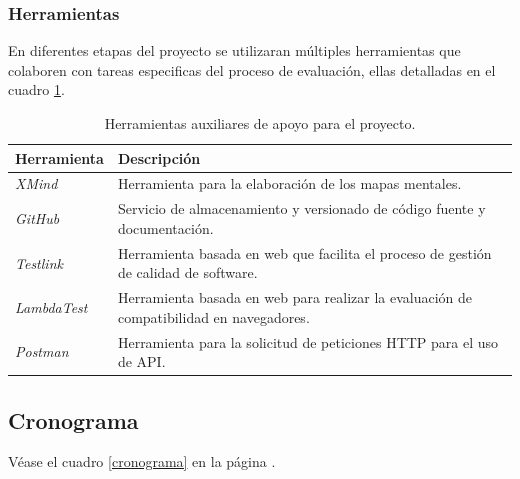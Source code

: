 \subsubsection{Herramientas}
En diferentes etapas del proyecto se utilizaran múltiples herramientas que
colaboren con tareas especificas del proceso de evaluación, ellas detalladas en
el cuadro \ref{herramientas}.

\begin{table}
\centering
\begin{tabular}{|l|p{13.5cm}|}
\hline
\textbf{Herramienta} & \textbf{Descripción} \\
\hline
\emph{XMind} & Herramienta para la elaboración de los mapas mentales. \\
\emph{GitHub} & Servicio de almacenamiento y versionado de código fuente y documentación. \\
\emph{Testlink} & Herramienta basada en web que facilita el proceso de gestión de calidad de software. \\
\emph{LambdaTest} & Herramienta basada en web para realizar la evaluación de compatibilidad en navegadores. \\
\emph{Postman} & Herramienta para la solicitud de peticiones HTTP para el uso de API.\\
\hline
\end{tabular}
\caption{Herramientas auxiliares de apoyo para el proyecto.}
\label{herramientas}
\end{table}

\subsection{Cronograma}
Véase el cuadro \ref{cronograma} en la página \pageref{cronograma}.

